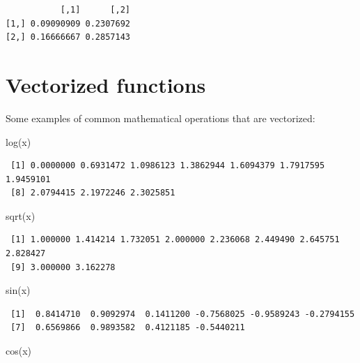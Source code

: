\documentclass[
]{book}
\newenvironment{Shaded}{\begin{snugshade}}{\end{snugshade}}
\newcommand{\FunctionTok}[1]{\textcolor[rgb]{0.00,0.00,0.00}{#1}}
\newcommand{\NormalTok}[1]{#1}
\begin{document}
\begin{verbatim}
           [,1]      [,2]
[1,] 0.09090909 0.2307692
[2,] 0.16666667 0.2857143
\end{verbatim}

\hypertarget{vectorized-functions}{%
\section{Vectorized functions}\label{vectorized-functions}}

Some examples of common mathematical operations that are vectorized:

\begin{Shaded}
\begin{Highlighting}[]
\FunctionTok{log}\NormalTok{(x)}
\end{Highlighting}
\end{Shaded}

\begin{verbatim}
 [1] 0.0000000 0.6931472 1.0986123 1.3862944 1.6094379 1.7917595 1.9459101
 [8] 2.0794415 2.1972246 2.3025851
\end{verbatim}

\begin{Shaded}
\begin{Highlighting}[]
\FunctionTok{sqrt}\NormalTok{(x)}
\end{Highlighting}
\end{Shaded}

\begin{verbatim}
 [1] 1.000000 1.414214 1.732051 2.000000 2.236068 2.449490 2.645751 2.828427
 [9] 3.000000 3.162278
\end{verbatim}

\begin{Shaded}
\begin{Highlighting}[]
\FunctionTok{sin}\NormalTok{(x)}
\end{Highlighting}
\end{Shaded}

\begin{verbatim}
 [1]  0.8414710  0.9092974  0.1411200 -0.7568025 -0.9589243 -0.2794155
 [7]  0.6569866  0.9893582  0.4121185 -0.5440211
\end{verbatim}

\begin{Shaded}
\begin{Highlighting}[]
\FunctionTok{cos}\NormalTok{(x)}
\end{Highlighting}
\end{Shaded}
\end{document}

